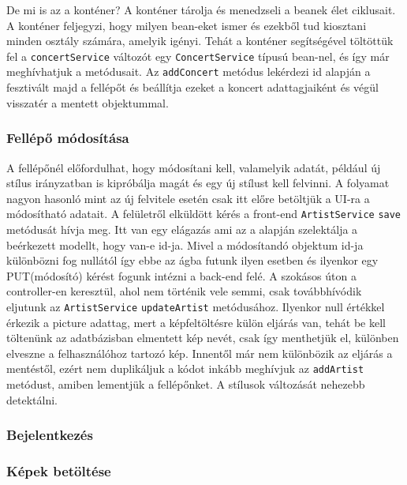 De mi is az a konténer? A konténer tárolja és menedzseli a beanek élet ciklusait. A konténer feljegyzi, hogy milyen bean-eket ismer és ezekből tud kiosztani minden osztály számára, amelyik igényi. Tehát a konténer segítségével töltöttük fel a \texttt{concertService} változót egy \texttt{ConcertService} típusú bean-nel, és így már meghívhatjuk a metódusait. Az \texttt{addConcert} metódus lekérdezi id alapján a fesztivált majd a fellépőt és beállítja ezeket a koncert adattagjaiként és végül visszatér a mentett objektummal.

\subsubsection{Fellépő módosítása}
A fellépőnél előfordulhat, hogy módosítani kell, valamelyik adatát, például új stílus irányzatban is kipróbálja magát és egy új stílust kell felvinni. A folyamat nagyon hasonló mint az új felvitele esetén csak itt előre betöltjük a UI-ra a módosítható adatait. A felületről elküldött kérés a front-end \texttt{ArtistService} \texttt{save} metódusát hívja meg. Itt van egy elágazás ami az a alapján szelektálja a beérkezett modellt, hogy  van-e id-ja. Mivel a módosítandó objektum id-ja különbözni fog nullától így ebbe az ágba futunk ilyen esetben és ilyenkor egy PUT(módosító) kérést fogunk intézni a back-end felé. A szokásos úton a controller-en keresztül, ahol nem történik vele semmi, csak továbbhívódik eljutunk az \texttt{ArtistService} \texttt{updateArtist} metódusához. Ilyenkor null értékkel érkezik a picture adattag, mert a képfeltöltésre külön eljárás van, tehát be kell töltenünk az adatbázisban elmentett kép nevét, csak így menthetjük el, különben elveszne a felhasználóhoz tartozó kép. Innentől már nem különbözik az eljárás a mentéstől, ezért nem duplikáljuk a kódot inkább meghívjuk az \texttt{addArtist} metódust, amiben lementjük a fellépőnket. A stílusok változását nehezebb detektálni. 

\subsubsection{Bejelentkezés}

\subsubsection{Képek betöltése}
